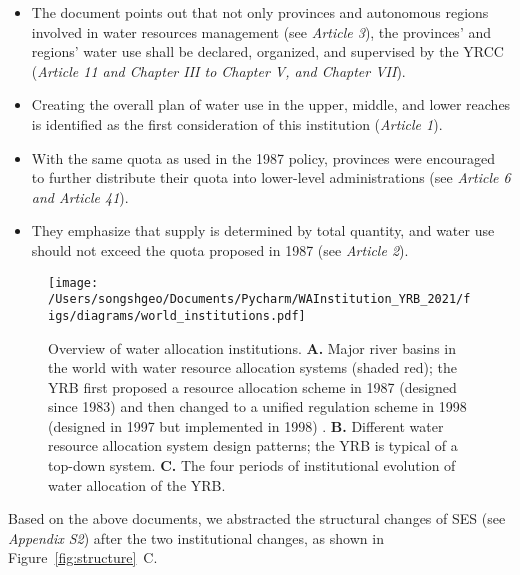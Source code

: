 \documentclass[default, sn-standardnature]{sn-jnl}
\begin{document}
\begin{itemize}
	\item The document points out that not only provinces and autonomous regions involved in water resources management (see \textit{Article 3}), the provinces’ and regions’ water use shall be declared, organized, and supervised by the YRCC (\textit{Article 11 and Chapter III to Chapter V, and Chapter VII}).
	\item Creating the overall plan of water use in the upper, middle, and lower reaches is identified as the first consideration of this institution (\textit{Article 1}).
	\item With the same quota as used in the 1987 policy, provinces were encouraged to further distribute their quota into lower-level administrations (see \textit{Article 6 and Article 41}).
	\item They emphasize that supply is determined by total quantity, and water use should not exceed the quota proposed in 1987 (see \textit{Article 2}).
\end{itemize}

\begin{figure*}[!htb]
    \centering
    \texttt{[image: /Users/songshgeo/Documents/Pycharm/WAInstitution\_YRB\_2021/figs/diagrams/world\_institutions.pdf]}
	\caption{
		Overview of water allocation institutions.
		\textbf{A.} Major river basins in the world with water resource allocation systems (shaded red); the YRB first proposed a resource allocation scheme in 1987 (designed since 1983) and then changed to a unified regulation scheme in 1998 (designed in 1997 but implemented in 1998) \cite{speed2013}.
		\textbf{B.} Different water resource allocation system design patterns; the YRB is typical of a top-down system.
		\textbf{C.} The four periods of institutional evolution of water allocation of the YRB.
	}
    \label{fig:world}
\end{figure*}

Based on the above documents, we abstracted the structural changes of SES (see \textit{Appendix S2}) after the two institutional changes, as shown in Figure~\ref{fig:structure}~C.
\end{document}

